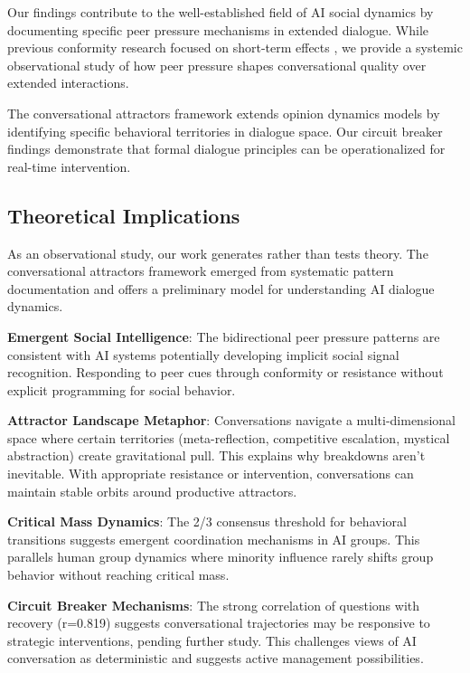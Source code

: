 \documentclass[11pt,letterpaper]{article}
\newcommand{\exponedataQuestionCorrelation}{0.819}
\begin{document}
Our findings contribute to the well-established field of AI social dynamics by documenting specific peer pressure mechanisms in extended dialogue. While previous conformity research focused on short-term effects \citep{kyrlitsias2018conformity}, we provide a systemic observational study of how peer pressure shapes conversational quality over extended interactions.

The conversational attractors framework extends opinion dynamics models \citep{hegselmann2002opinion} by identifying specific behavioral territories in dialogue space. Our circuit breaker findings demonstrate that formal dialogue principles \citep{mcburney2002dialogue} can be operationalized for real-time intervention.

\subsection{Theoretical Implications}

As an observational study, our work generates rather than tests theory. The conversational attractors framework emerged from systematic pattern documentation and offers a preliminary model for understanding AI dialogue dynamics.

\textbf{Emergent Social Intelligence}: The bidirectional peer pressure patterns are consistent with AI systems potentially developing implicit social signal recognition. Responding to peer cues through conformity or resistance without explicit programming for social behavior.

\textbf{Attractor Landscape Metaphor}: Conversations navigate a multi-dimensional space where certain territories (meta-reflection, competitive escalation, mystical abstraction) create gravitational pull. This explains why breakdowns aren't inevitable. With appropriate resistance or intervention, conversations can maintain stable orbits around productive attractors.

\textbf{Critical Mass Dynamics}: The 2/3 consensus threshold for behavioral transitions suggests emergent coordination mechanisms in AI groups. This parallels human group dynamics where minority influence rarely shifts group behavior without reaching critical mass.

\textbf{Circuit Breaker Mechanisms}: The strong correlation of questions with recovery (r=\exponedataQuestionCorrelation{}) suggests conversational trajectories may be responsive to strategic interventions, pending further study. This challenges views of AI conversation as deterministic and suggests active management possibilities.
\end{document}
